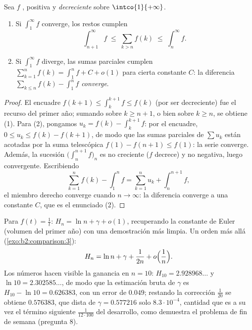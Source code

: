 \begin{theorem}\label{thm:b2:comparison:seriesintegral}
Sea $f$ , positiva y \emph{decreciente} sobre
$\intco{1}{+\infty}$.
\begin{enumerate}
  \item Si $\int_1^{\infty} f$ converge, los restos cumplen
        \[
        \int_{n+1}^{\infty} f \;\leq\; \sum_{k > n} f(k) \;\leq\;
        \int_{n}^{\infty} f .
        \]
  \item Si $\int_1^\infty f$ diverge, las sumas parciales cumplen
        $\sum_{k=1}^{n} f(k) = \int_1^n f + C + o(1)$ para cierta
        constante $C$: la diferencia $\sum_{k \leq n} f(k) - \int_1^n
        f$ \emph{converge}.
\end{enumerate}
\end{theorem}

\begin{proof}
El encuadre $f(k+1) \leq \int_k^{k+1} f \leq f(k)$ (por ser
decreciente) fue el recurso del primer año; sumando sobre $k \geq
n+1$, o bien sobre $k \geq n$, se obtiene (1). Para (2), pongamos
$u_k = f(k) - \int_k^{k+1} f$: por el encuadre, $0 \leq u_k \leq
f(k) - f(k+1)$, de modo que las sumas parciales de $\sum u_k$ están
acotadas por la suma telescópica $f(1) - f(n+1) \leq f(1)$: la serie
converge. Además, la sucesión $\bigl(\int_n^{n+1} f\bigr)_n$ es no
creciente ($f$ decrece) y no negativa, luego convergente.
Escribiendo
\[
\sum_{k=1}^{n} f(k) - \int_1^n f
= \sum_{k=1}^{n} u_k + \int_n^{n+1} f ,
\]
el miembro derecho converge cuando $n \to \infty$: la diferencia
converge a una constante $C$, que es el enunciado (2).
\end{proof}

\begin{example}\label{ex:b2:comparison:harmonic}
Para $f(t) = \frac1t$: $H_n = \ln n + \gamma + o(1)$, recuperando
la constante de Euler (volumen del primer año) con una demostración
más limpia. Un orden más allá (\cref{exo:b2:comparison:3}):
\[
H_n = \ln n + \gamma + \frac{1}{2n} + o\Bigl(\frac1n\Bigr).
\]
Los números hacen visible la ganancia en $n = 10$: $H_{10} =
2.928968\dots$ y $\ln 10 = 2.302585\dots$, de modo que la
estimación bruta de $\gamma$ es $H_{10} - \ln 10 = 0.626383$, con
un error de $0.049$; restando la corrección $\frac1{20}$ se obtiene
$0.576383$, que dista de $\gamma = 0.577216$ solo
$8.3\cdot10^{-4}$, cantidad que es a su vez el término siguiente
$\frac{1}{12\cdot100}$ del desarrollo, como demuestra el problema
de fin de semana (pregunta 8).
\end{example}

